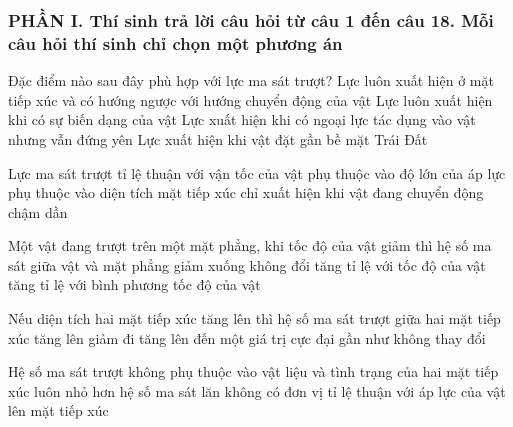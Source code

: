 \subsubsection*{PHẦN I. Thí sinh trả lời câu hỏi từ câu 1 đến câu 18. Mỗi câu hỏi thí sinh chỉ chọn một phương án}
\setcounter{ex}{0}
\begin{ex}%
Đặc điểm nào sau đây phù hợp với lực ma sát trượt?
\choice
{\True Lực luôn xuất hiện ở mặt tiếp xúc và có hướng ngược với hướng chuyển động của vật}
{Lực luôn xuất hiện khi có sự biến dạng của vật}
{Lực xuất hiện khi có ngoại lực tác dụng vào vật nhưng vẫn đứng yên}
{Lực xuất hiện khi vật đặt gần bề mặt Trái Đất}
 \end{ex}
\begin{ex}%
Lực ma sát trượt
\choice
{tỉ lệ thuận với vận tốc của vật}
{\True phụ thuộc vào độ lớn của áp lực}
{phụ thuộc vào diện tích mặt tiếp xúc}
{chỉ xuất hiện khi vật đang chuyển động chậm dần}
 \end{ex}
\begin{ex}%
Một vật đang trượt trên một mặt phẳng, khi tốc độ của vật giảm thì hệ số ma sát giữa vật và mặt phẳng
\choice
{giảm xuống}
{\True không đổi}
{tăng tỉ lệ với tốc độ của vật}
{tăng tỉ lệ với bình phương tốc độ của vật}
 \end{ex}
\begin{ex}%
Nếu diện tích hai mặt tiếp xúc tăng lên thì hệ số ma sát trượt giữa hai mặt tiếp xúc
\choice
{tăng lên}
{giảm đi}
{tăng lên đến một giá trị cực đại}
{\True gần như không thay đổi}
 \end{ex}
\begin{ex}%
Hệ số ma sát trượt
\choice
{không phụ thuộc vào vật liệu và tình trạng của hai mặt tiếp xúc}
{luôn nhỏ hơn hệ số ma sát lăn}
{\True không có đơn vị}
{tỉ lệ thuận với áp lực của vật lên mặt tiếp xúc}
 \end{ex}
